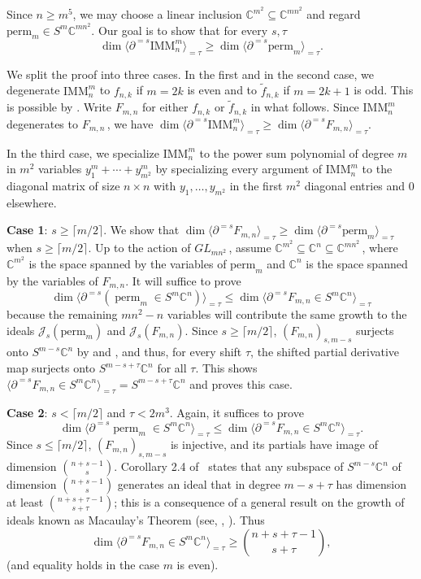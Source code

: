 \documentclass{toc}
\newcommand{\vvirg}{ , \dots , }
\newcommand{\calJ}{\mathcal{J}}
\newcommand{\bbC}{\mathbb{C}}
\renewcommand{\tilde}[1]{\widetilde{#1}}
\newcommand{\perm}{\mathrm{perm}}
\def\BC{\mathbb C}
\def\t{\tau}
\def\tperm{\operatorname{perm}}
\def\tdim{\operatorname{dim}}
\newcommand{\IMM}{\mathrm{IMM}}
\begin{document}
Since $ n \geq m^5$, we may choose a linear inclusion $\BC^{m^2}\subseteq \BC^{mn^2}$ and regard   $\perm_m\in S^m \bbC^{mn^2}$. Our goal is to show that for every $s,\tau$
\[
\dim \langle \partial^{=s} \IMM^m_n \rangle_{=\tau} \geq \dim \langle \partial^{=s} \perm_m \rangle_{=\tau}.
\]

We split the proof into three cases. In the first and in the second case, we degenerate $\IMM^m_n$ to $f_{n,k}$ if $m=2k$ is even and to $\tilde{f}_{n,k}$ if $m=2k+1$ is odd. This is possible by . Write $F_{m,n}$ for either $f_{n,k}$ or $\tilde f_{n,k}$ in what follows. Since $\IMM^m_n$ degenerates to $F_{m,n}$\,, we have $\dim \langle \partial^{=s} \IMM^m_n \rangle_{=\tau} \geq \dim \langle \partial^{=s} F_{m,n} \rangle_{=\tau}$. 

In the third case, we specialize $\IMM^m_n$ to the power sum polynomial of degree $m$ in $m^2$ variables $y_1^{m} + \cdots + y_{m^2}^m$ by specializing every argument of $\IMM^m_n$ to the diagonal matrix of size $n \times n$ with $y_1 \vvirg y_{m^2}$ in the first $m^2$ diagonal entries and $0$ elsewhere.
 

{\bf Case 1}:  $s \geq \lceil {m}/{2}\rceil $. We show that $\dim \langle \partial^{=s} F_{m,n} \rangle_{=\tau} \geq \dim \langle \partial^{=s} \perm_m \rangle_{=\tau}$ when $s\geq\lceil m/2\rceil$. Up to the action of $GL_{mn^2}$\,, assume $\bbC^{m^2} \subseteq \bbC^n \subseteq \bbC^{mn^2}$\,, where $\bbC^{m^2}$ is the space spanned by the variables of $\perm_m$ and $\bbC^n$ is the space spanned by the variables of $F_{m,n}$. It will suffice to prove
\[
  \tdim  \langle \partial^{=s}(\tperm_m \in S^m\BC^{n})\rangle_{=\t}\leq \tdim  \langle \partial^{=s}F_{m,n} \in S^m\BC^{n}\rangle_{=\t}
\]
because the remaining $mn^2-n$ variables will contribute the same
growth to the ideals $\calJ_s(\perm_m)$ and $\calJ_s(F_{m,n})$. Since
$s\geq \lceil {m}/{2}\rceil$, $(F_{m,n})_{s, m-s}$ surjects onto
$S^{m-s} \bbC^n$ by  and , and thus, for every shift $\tau$, the shifted partial
derivative map surjects onto $S^{ m-s +\t} \BC^n$ for all $\t$. This
shows
$\langle \partial^{=s}F_{m,n} \in S^m\BC^{n}\rangle_{=\t} = S^{ m-s
  +\t}\BC^n$ and proves this case.
 

{\bf Case 2}: $s <\lceil m/2\rceil $ and $\t< 2m^3$. Again, it suffices to prove
\[
  \tdim  \langle \partial^{=s} \tperm_m\in S^m\BC^{n} \rangle_{=\t}\leq \tdim  \langle \partial^{=s}F_{m,n} \in  S^m\BC^{n} \rangle_{=\t}.
\]
Since $s \leq \lceil m/2 \rceil$, $(F_{m,n})_{s,m-s}$ is injective,
and its partials have image of dimension $\binom{n+s-1}{s}$. Corollary
2.4 of~\cite{2016arXiv160902103E} states that any subspace of
$S^{m-s}\BC^n$ of dimension $\binom{n+s-1}s$ generates an ideal that
in degree $m-s+\t$ has dimension at least $\binom {n+s+\t-1}{s+\t}$;
this is a consequence of a general result on the growth of ideals
known as Macaulay's Theorem (see, \eg,
\cite{Stan:HilbertFunGradedAlgebras}). Thus
$$
 \tdim  \langle \partial^{=s}F_{m,n} \in  S^m\BC^{n} \rangle_{=\t} \geq \binom {n+s+\t-1}{s+\t},
$$
(and equality holds in the case $m$ is even).
\end{document}
